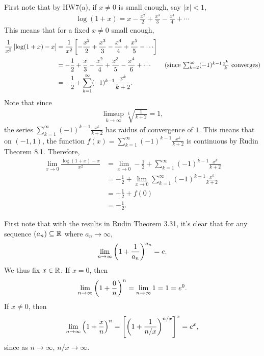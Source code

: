 \documentclass[12pt]{article}
\begin{document}
\begin{fproof}[1(b)]
 First note that by HW7(a), if \(x \neq 0\) is small enough, say \(|x| < 1\),
 \begin{align*}
    \log(1+x)= x - \frac{x^2}{2} + \frac{x^3}{3} - \frac{x^4}{4} + \cdots
 \end{align*}
 This means that for a fixed \(x \neq 0\) small enough,
 \begin{align*}
    \frac{1}{x^2}\brac{\log(1+x) - x} 
    &= \frac{1}{x^2} \brac{-\frac{x^2}{2} + \frac{x^3}{3} - \frac{x^4}{4} + \frac{x^5}{5} - \cdots}\\
    & = -\frac{1}{2} + \frac{x}{3} - \frac{x^2}{4} + \frac{x^3}{5} - \frac{x^4}{6} + \cdots \tag{since \(\sum_{k=2}^{\infty} (-1)^{k-1} \frac{x^k}{k}\) converges}\\
    &=-\frac{1}{2} + \sum_{k=1}^{\infty} (-1)^{k-1} \frac{x^{k}}{k+2}.
 \end{align*}
 Note that since
 \begin{align*}
   \limsup_{k \to \infty} \sqrt[k]{\frac{1}{k+2}} = 1,
 \end{align*}
 the series \(\sum_{k=1}^{\infty} (-1)^{k-1} \frac{x^{k}}{k+2}\) has raidus of convergence of \(1\).
 This means that on \((-1,1)\), the function \(f(x) = \sum_{k=1}^{\infty} (-1)^{k-1} \frac{x^{k}}{k+2}\) is continuous by Rudin Theorem 8.1.
 Therefore,
 \begin{align*}
   \lim_{x \to 0} \frac{\log(1 + x)-x}{x^2} 
   & = \lim_{x \to 0} -\frac{1}{2} + \sum_{k=1}^{\infty} (-1)^{k-1} \frac{x^{k}}{k+2} \tag{since they agree on \(|x| < 1\)}\\
   & = -\frac{1}{2} + \lim_{x \to 0} \sum_{k=1}^{\infty} (-1)^{k-1} \frac{x^{k}}{k+2} \tag{since the series converges}\\
   &= -\frac{1}{2} + f(0) \tag{since \(f\) is continous at \(0\)}\\
   & = -\frac{1}{2}. \tag{since \(f(0)=0\)}
 \end{align*}
\end{fproof}

\begin{fproof}[1(c)]
 First note that with the results in Rudin Theorem 3.31, it's clear that for any sequence \((a_n) \subseteq \mathbb {R}\) where \(a_n \to \infty\),
 \begin{align*}
   \lim_{n \to \infty} \left( 1 + \frac{1}{a_n} \right)^{a_n} = e.
 \end{align*}
 We thus fix \(x \in \mathbb {R}\).
 If \(x = 0\), then 
 \begin{align*}
   \lim_{n \to \infty} \left( 1 + \frac{0}{n} \right)^n = \lim_{n \to \infty} 1 = 1 = e^0.
 \end{align*}
 If \(x \neq 0\), then
 \begin{align*}
   \lim_{n \to \infty} \left( 1 + \frac{x}{n} \right)^n = \left[ \left( 1 + \frac{1}{n/x} \right)^{n/x} \right]^x = e^x,
 \end{align*}
 since as \(n \to \infty\), \(n/x \to \infty\).
\end{fproof}
\newpage
\end{document}
